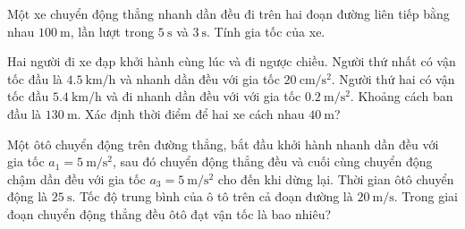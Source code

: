 \begin{ex}
	Một xe chuyển động thẳng nhanh dần đều đi trên hai đoạn đường liên tiếp bằng nhau $\SI{100}{\meter}$, lần lượt trong $\SI{5}{\second}$ và $\SI{3}{\second}$. Tính gia tốc của xe.
	\loigiai{}
\end{ex}
\begin{ex}
	Hai người đi xe đạp khởi hành cùng lúc và đi ngược chiều. Người thứ nhất có vận tốc đầu là $\SI{4.5}{\kilo\meter/\hour}$ và nhanh dần đều với gia tốc $\SI{20}{\centi\meter/\second^2}$. Người thứ hai có vận tốc đầu $\SI{5.4}{\kilo\meter/\hour}$ và đi nhanh dần đều với với gia tốc $\SI{0.2}{\meter/\second^2}$. Khoảng cách ban đầu là $\SI{130}{\meter}$. Xác định thời điểm để hai xe cách nhau $\SI{40}{\meter}$?
	
	\loigiai{}
\end{ex}
\begin{ex}
	Một ôtô chuyển động trên đường thẳng, bắt đầu khởi hành nhanh dần đều với gia tốc $a_1=\SI{5}{\meter/\second^2}$, sau đó chuyển động thẳng đều và cuối cùng chuyển động chậm dần đều với gia tốc $a_3 = \SI{5}{\meter/\second^2}$ cho đến khi dừng lại. Thời gian ôtô chuyển động là $\SI{25}{\second}$. Tốc độ trung bình của ô tô trên cả đoạn đường là $\SI{20}{\meter/\second}$. Trong giai đoạn chuyển động thẳng đều ôtô đạt vận tốc là bao nhiêu?
	\loigiai{}
\end{ex}